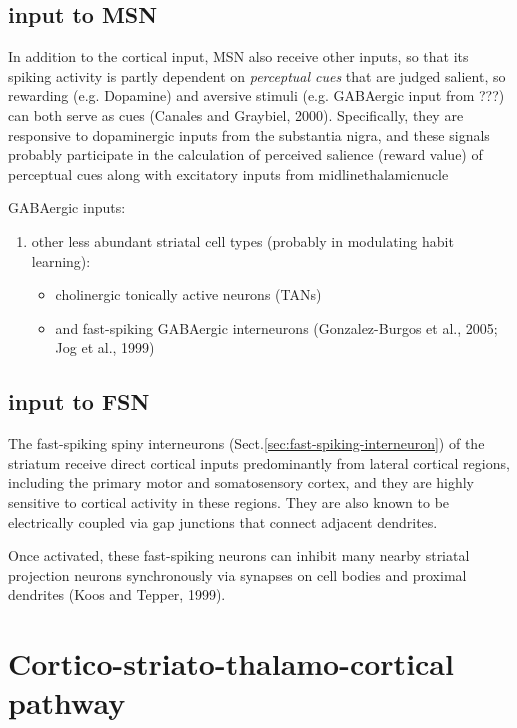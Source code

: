 \subsection{input to MSN}

In addition to the cortical input, MSN also receive other inputs, so that its
spiking activity is partly dependent on {\it perceptual cues} that are judged
salient, so rewarding (e.g. Dopamine) and aversive stimuli (e.g. GABAergic input from
???) can both serve as cues (Canales and Graybiel, 2000).
Specifically,  they  are
responsive to dopaminergic inputs from the substantia
nigra,  and  these  signals  probably  participate  in  the
calculation  of  perceived  salience  (reward  value)  of
perceptual  cues  along  with  excitatory   inputs  from
midlinethalamicnucle


GABAergic inputs:
\begin{enumerate}
  \item  other less abundant striatal cell types (probably in modulating habit
  learning):

\begin{itemize}
  \item  cholinergic tonically active neurons (TANs)

 \item   and fast-spiking GABAergic interneurons (Gonzalez-Burgos et al., 2005;
 Jog et al., 1999)
  
\end{itemize}


\end{enumerate}

\subsection{input to FSN}

The fast-spiking spiny interneurons (Sect.\ref{sec:fast-spiking-interneuron}) of
the striatum receive direct cortical inputs predominantly from lateral cortical 
regions,  including  the  primary  motor  and somatosensory cortex, and they are
highly sensitive to cortical activity in these regions. They are also known to
be  electrically  coupled  via  gap  junctions  that  connect adjacent 
dendrites.

Once  activated,  these  fast-spiking neurons  can  inhibit  many  nearby 
striatal  projection neurons synchronously via synapses on cell bodies and
proximal dendrites (Koos and Tepper, 1999).

\section{Cortico-striato-thalamo-cortical pathway}
\label{sec:cortico-striato-thalamo-cortical-pathway}
\label{sec:parallel-pathways}

